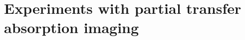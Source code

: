 \appendix
\renewcommand{\thechapter}{A}
\renewcommand{\chaptername}{Appendix}

\chapter{Experiments with partial transfer absorption imaging}

